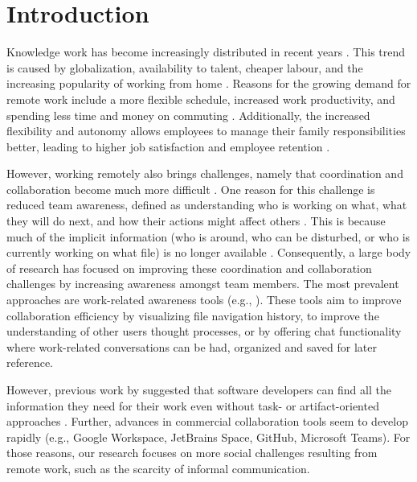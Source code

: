 \chapter{Introduction}
\label{chapter:introduction}
Knowledge work has become increasingly distributed in recent years \autocite{herbsleb2001global}. This trend is caused by globalization, availability to talent, cheaper labour,  and the increasing popularity of working from home \autocite{herbsleb2007global, ecoWorkingFromHome2021}. Reasons for the growing demand for remote work include a more flexible schedule, increased work productivity, and spending less time and money on commuting \autocite{flores2019understanding, mulki2009set}. Additionally, the increased flexibility and autonomy allows employees to manage their family responsibilities better, leading to higher job satisfaction and employee retention \autocite{mulki2009set, gajendran2007good, madsen2011benefits}.

However, working remotely also brings challenges, namely that coordination and collaboration become much more difficult \autocite{herbsleb2007global}. One reason for this challenge is reduced team awareness, defined as understanding who is working on what, what they will do next, and how their actions might affect others \autocite{dourish1992awareness, herbsleb2007global, gutwin2004group}. %
This is because much of the implicit information (who is around, who can be disturbed, or who is currently working on what file) is no longer available \autocite{gutwin2004importance}. Consequently, a large body of research has focused on improving these coordination and collaboration challenges by increasing awareness amongst team members. The most prevalent approaches are work-related awareness tools (e.g., \autocite{biehl2007fastdash, jakobsen2009wipdash, cheng2003jazzing, deline2005easing}). These tools aim to  improve collaboration efficiency by visualizing file navigation history, to improve the understanding of other users thought processes, or by offering chat functionality where work-related conversations can be had, organized and saved for later reference. 

However, previous work by \citeauthor{gutwin2004group} suggested that software developers can find all the information they need for their work even without task- or artifact-oriented approaches \autocite{gutwin2004group}. Further, advances in commercial collaboration tools seem to develop rapidly (e.g., Google Workspace, JetBrains Space, GitHub, Microsoft Teams). For those reasons, our research focuses on more social challenges resulting from remote work, such as the scarcity of informal communication.

